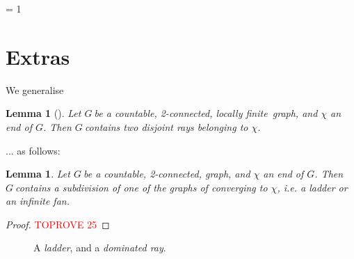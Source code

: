 \documentclass{article}
\newcommand{\Debug}{0}
\newcommand{\defi}[1]{{\color{darkgray}\emph{#1}}}
\newtheorem{lemma}[proposition]{Lemma}
\newcommand{\g}{\ensuremath{G\ }}
\newcommand{\G}{\ensuremath{G}}
\newcommand{\lf}{locally finite}
\newcommand{\extras}[1]{\ifnum \Debug = 1
\section{Extras} #1
 \fi
}
\begin{document}
\extras{

We generalise 
\begin{lemma}[\cite{halin74}] \label{LemHal}
Let \g be a countable, 2-connected, \lf\ graph, and $\chi$ an end of \G. Then \g contains two disjoint rays belonging to $\chi$.
\end{lemma}

... as follows: 

\begin{lemma} \label{LemLadFan}
Let \g be a countable, 2-connected, graph, and $\chi$ an end of \G. Then \g contains a subdivision of one of the graphs of \fig{} converging to $\chi$, i.e. a ladder or an infinite fan.
\end{lemma}
\begin{proof}\textcolor{red}{TOPROVE 25}\end{proof}


\begin{figure} 
\begin{center}
\end{center}
\caption{A \defi{ladder}, and a \defi{dominated ray}.} \label{figLadStar}
\end{figure}

}
\end{document}
